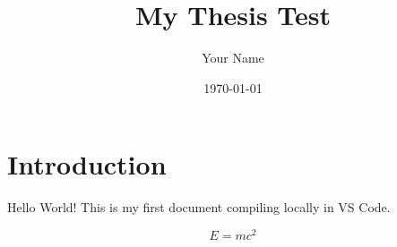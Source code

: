 \documentclass{article}
\title{My Thesis Test}
\author{Your Name}
\date{\today}
\begin{document}
\maketitle

\section{Introduction}
Hello World! This is my first document compiling locally in VS Code.

\begin{equation}
    E = mc^2
\end{equation}
\end{document}
